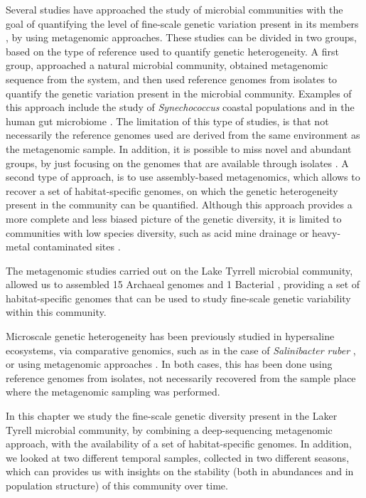 Several studies have approached the study of microbial communities with the goal of quantifying the level of fine-scale genetic variation present in its members \cite{Wilmes:2009bn}, by using metagenomic approaches. These studies can be divided in two groups, based on the type of reference used to quantify genetic heterogeneity. A first group, approached a natural microbial community, obtained metagenomic sequence from the system, and then used reference genomes from isolates to quantify the genetic variation present in the microbial community. Examples of this approach include the study of \textit{Synechococcus} coastal populations \cite{Tai:2011jo} and in the human gut microbiome \cite{Schloissnig:2012hx}. The limitation of this type of studies, is that not necessarily the reference genomes used are derived from the same environment as the metagenomic sample. In addition, it is possible to miss novel and abundant groups, by just focusing on the genomes that are available through isolates \cite{Podell:2013kx,Herlemann:uy}. A second type of approach, is to use assembly-based metagenomics, which allows to recover a set of habitat-specific genomes, on which the genetic heterogeneity present in the community can be quantified. Although this approach provides a more complete and less biased picture of the genetic diversity, it is limited to communities with low species diversity, such as acid mine drainage \cite{Allen:2007ju} or heavy-metal contaminated sites \cite{Hemme:2010ds}.

The metagenomic studies carried out on the Lake Tyrrell microbial community, allowed us to assembled 15 Archaeal genomes and 1 Bacterial \cite{Narasingarao:2012kp,Podell:2013kx,Podell:2013fp}, providing a set of habitat-specific genomes that can be used to study fine-scale genetic variability within this community.

Microscale genetic heterogeneity has been previously studied in hypersaline ecosystems, via comparative genomics, such as in the case of \textit{Salinibacter ruber} \cite{PeNtildeA:2010ie}, or using metagenomic approaches \cite{Legault:2006kh,Pasic:2009bo,}. In both cases, this has been done using reference genomes from isolates, not necessarily recovered from the sample place where the metagenomic sampling was performed. 

In this chapter we study the fine-scale genetic diversity present in the Laker Tyrell microbial community, by combining a deep-sequencing metagenomic approach, with the availability of a set of habitat-specific genomes. In addition, we looked at two different temporal samples, collected in two different seasons, which can provides us with insights on the stability (both in abundances and in population structure) of this community over time.


